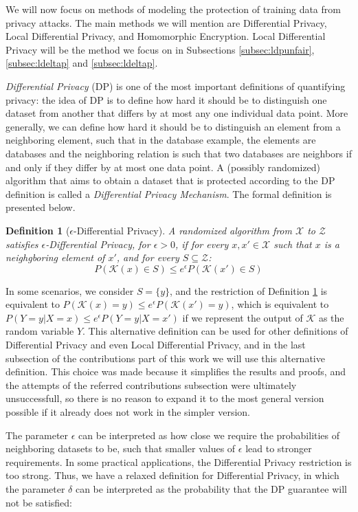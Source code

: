 \documentclass[conference]{IEEEtran}
\newtheorem{definition}{Definition}
\begin{document}
We will now focus on methods of modeling the protection of training data from privacy attacks. The main methods we will mention are Differential Privacy, Local Differential Privacy, and Homomorphic Encryption. Local Differential Privacy will be the method we focus on in Subsections \ref{subsec:ldpunfair}, \ref{subsec:ldeltap} and \ref{subsec:ldeltap}.

\emph{Differential Privacy} (DP) is one of the most important definitions of quantifying privacy: the idea of DP is to define how hard it should be to distinguish one dataset from another that differs by at most any one individual data point. More generally, we can define how hard it should be to distinguish an element from a neighboring element, such that in the database example, the elements are databases and the neighboring relation is such that two databases are neighbors if and only if they differ by at most one data point. A (possibly randomized) algorithm that aims to obtain a dataset that is protected according to the DP definition is called a \emph{Differential Privacy Mechanism}. The formal definition is presented below. 

\begin{definition}[$\epsilon$-Differential Privacy]\label{def:epsilonLDP} A randomized algorithm from $\mathcal{X}$ to $\mathcal{Z}$ satisfies $\epsilon$-Differential Privacy, for $\epsilon > 0$, if for every $x,x' \in \mathcal{X}$ such that $x$ is a neighgboring element of $x'$, and for every $S \subseteq \mathcal{Z}$:
$$P(\mathcal{K}(x) \in S) \leq e^\epsilon P(\mathcal{K}(x')\in S)$$
\end{definition}

In some scenarios, we consider $S = \{y\}$, and the restriction of Definition \ref{def:epsilonLDP} is equivalent to $P(\mathcal{K}(x) = y) \leq e^\epsilon P(\mathcal{K}(x') =  y)$, which is equivalent to $P(Y = y|X=x) \leq e^\epsilon P(Y =  y|X=x')$ if we represent the output of $\mathcal{K}$ as the random variable $Y$. This alternative definition can be used for other definitions of Differential Privacy and even Local Differential Privacy, and in the last subsection of the contributions part of this work we will use this alternative definition. This choice was made because it simplifies the results and proofs, and the attempts of the referred contributions subsection were ultimately unsuccessfull, so there is no reason to expand it to the most general version possible if it already does not work in the simpler version.

The parameter $\epsilon$ can be interpreted as how close we require the probabilities of neighboring datasets to be, such that smaller values of $\epsilon$ lead to stronger requirements. In some practical applications, the Differential Privacy restriction is too strong. Thus, we have a relaxed definition for Differential Privacy, in which the parameter $\delta$ can be interpreted as the probability that the DP guarantee will not be satisfied:
\end{document}
